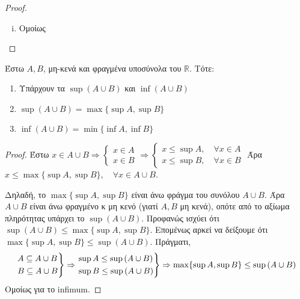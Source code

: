\begin{proof}
\begin{enumerate}[(i)]
    \item Ομοίως
  \end{enumerate}
\end{proof}

\begin{mybox3}
\begin{prop}
  Έστω $ A, B $, μη-κενά και φραγμένα υποσύνολα του $ \mathbb{R} $. Τότε: 
  \begin{enumerate}
    \item Υπάρχουν τα $ \sup {(A \cup B)} $ και $ \inf {(A \cup B)} $
    \item $ \sup {(A \cup B)} = \max \{ \sup A, \sup B \} $
    \item $ \inf {(A \cup B)} = \min \{ \inf A, \inf B \} $
  \end{enumerate}
\end{prop}
\end{mybox3}
\begin{proof}
\item {}
  Έστω $ x \in A \cup B \Rightarrow 
  \begin{cases} 
    x \in A  \\
    x \in B  
  \end{cases} \Rightarrow 
  \begin{cases} 
    x \leq \sup A, \quad \forall x \in A \\
    x \leq \sup B,  \quad \forall x \in B     
  \end{cases}
  $  
  Άρα $ x \leq \max \{ \sup A, \sup B \} , \quad \forall x \in A \cup B $.

  Δηλαδή, το $ \max \{ \sup A, \sup B \} $ είναι άνω φράγμα του συνόλου 
  $ A \cup B $. Άρα $ A \cup B $ είναι άνω φραγμένο κ μη κενό 
  (γιατί $A,B$ μη κενά), οπότε από το αξίωμα πληρότητας υπάρχει το 
  $ \sup {(A \cup B)} $. 
  Προφανώς ισχύει ότι $ \sup {(A \cup B)} \leq \max \{ \sup A, \sup B \} $.
  Επομένως αρκεί να δείξουμε ότι $ \max \{ \sup A, \sup B \} \leq \sup {(A \cup B)}
  $. Πράγματι, 
  \[
    \begin{rcases} 
      A \subseteq A \cup B \\
      B \subseteq A \cup B \\
    \end{rcases} \Rightarrow 
    \begin{rcases} 
      \sup A \leq \sup {(A \cup B)} \\
      \sup B \leq \sup {(A \cup B)} \\
    \end{rcases} \Rightarrow 
    \max \{ \sup A, \sup B \} \leq \sup {(A \cup B)}
  \] 
  Ομοίως για το infimum.
\end{proof}

